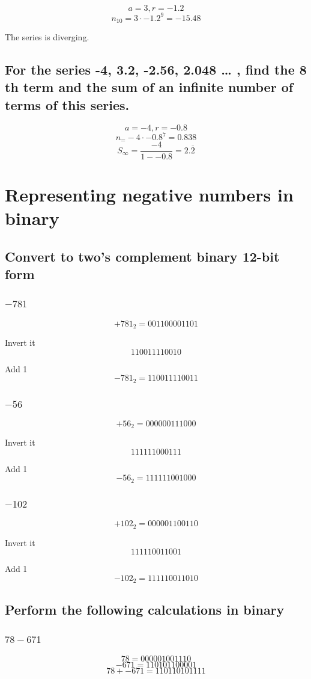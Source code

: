 \documentclass[12pt]{article}
\begin{document}
\[a=3, r=-1.2\]
\[n_{10}=3\cdot-1.2^9=-15.48\]

The series is diverging.

\subsection{For the series -4, 3.2, -2.56, 2.048 … , find the 8
th term and the sum of an
infinite number of terms of this series.}

\[a=-4, r=-0.8\]
\[n_=-4\cdot-0.8^7=0.838\]
\[S_{\infty}=\frac{-4}{1--0.8}=2.\overline{2}\]

\section{Representing negative numbers in binary}

\subsection{Convert to two's complement binary 12-bit form}
\subsubsection{$-781$}
\[+781_2=001100001101\]

Invert it
\[110011110010\]

Add 1
\[-781_2=110011110011\]

\subsubsection{$-56$}
\[+56_2=000000111000\]

Invert it
\[111111000111\]

Add 1
\[-56_2=111111001000\]

\subsubsection{$-102$}
\[+102_2=000001100110\]

Invert it
\[111110011001\]

Add 1
\[-102_2=111110011010\]

\subsection{Perform the following calculations in binary}
\subsubsection{$78-671$}
\[78=000001001110\]
\[-671=110101100001\]
\[78+-671=110110101111\]
\end{document}
